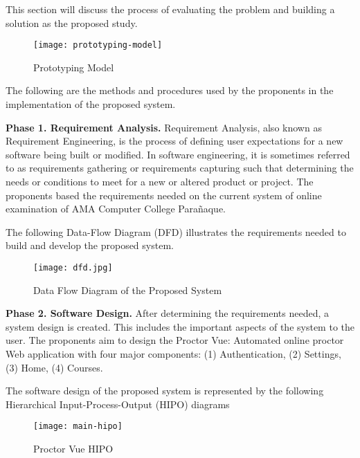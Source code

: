 This section will discuss the process of evaluating the problem and building a solution as the proposed study.

\begin{figure}[h!]
   \begin{center}
      \texttt{[image: prototyping-model]}
      \caption{Prototyping Model}
   \end{center}
\end{figure}

The following are the methods and procedures used by the proponents in the implementation of the proposed system.

\textbf{Phase 1. Requirement Analysis.}
Requirement Analysis, also known as Requirement Engineering, is the process of defining user expectations for a new software being built or modified.
In software engineering, it is sometimes referred to as requirements gathering or requirements capturing such that determining the needs or conditions to meet for a new or altered product or project.
The proponents based the requirements needed on the current system of online examination of AMA Computer College Parañaque.

The following Data-Flow Diagram (DFD) illustrates the requirements needed to build and develop the proposed system.

\begin{figure}[h!]
   \begin{center}
      \texttt{[image: dfd.jpg]}
      \caption{Data Flow Diagram of the Proposed System}
   \end{center}
\end{figure}

\textbf{Phase 2. Software Design.}
After determining the requirements needed, a system design is created.
This includes the important aspects of the system to the user.
The proponents aim to design the Proctor Vue: Automated online proctor Web application with four major components: (1) Authentication, (2) Settings, (3) Home, (4) Courses.

The software design of the proposed system is represented by the following Hierarchical Input-Process-Output (HIPO) diagrams

\begin{figure}[h!]
   \begin{center}
      \texttt{[image: main-hipo]}
      \caption{Proctor Vue HIPO}
   \end{center}
\end{figure}


